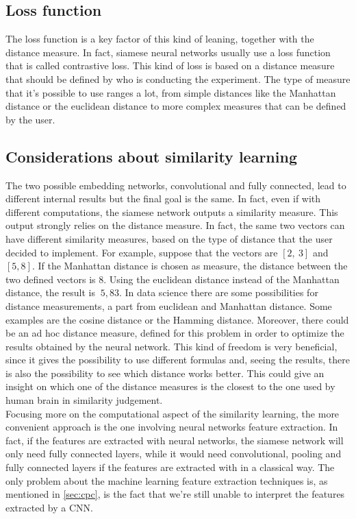 \documentclass[conference]{IEEEtran}
\begin{document}
		\subsection{Loss function}
		
			\noindent The loss function is a key factor of this kind of leaning, together with the distance measure. In fact, siamese neural networks usually use a loss function that is called contrastive loss. This kind 
			of loss is based on a distance measure that should be defined by who is conducting the experiment. The type of measure that it's possible to use ranges a lot, from simple distances like the Manhattan distance 
			or the euclidean distance to more complex measures that can be defined by the user. 
		
		\subsection{Considerations about similarity learning\label{sec:csl}}
		
			\noindent The two possible embedding networks, convolutional and fully connected, lead to different internal results but the final goal is the same. In fact, even if with different computations, the siamese 
			network outputs a similarity measure. This output strongly relies on the distance measure. In fact, the same two vectors can have different similarity measures, based on the type of distance that the user 
			decided to implement. For example, suppose that the vectors are $[2,\ 3]$ and $[5, 8]$. If the Manhattan distance is chosen as measure, the distance between the two defined vectors is $8$. 
			Using the euclidean distance instead of the Manhattan distance, the result is $~5,83$. In data science there are some possibilities for distance measurements, a part from euclidean and Manhattan distance. Some 
			examples are the cosine distance or the Hamming distance. Moreover, there could be an ad hoc distance measure, defined for this problem in order to optimize the results obtained by the neural network. 
			This kind of freedom is very beneficial, since it gives the possibility to use different formulas and, seeing the results, there is also the possibility to see which distance works better. This could give an 
			insight on which one of the distance measures is the closest to the one used by human brain in similarity judgement. \\
			Focusing more on the computational aspect of the similarity learning, the more convenient approach is the one involving neural networks feature extraction. In fact, if the features are extracted with 
			neural networks, the siamese network will only need fully connected layers, while it would need convolutional, pooling and fully connected layers if the features are extracted with in a classical way. 
			The only problem about the machine learning feature extraction techniques is, as mentioned in \ref{sec:cpc}, is the fact that we're still unable to interpret the features extracted by a CNN.
	
\end{document}
